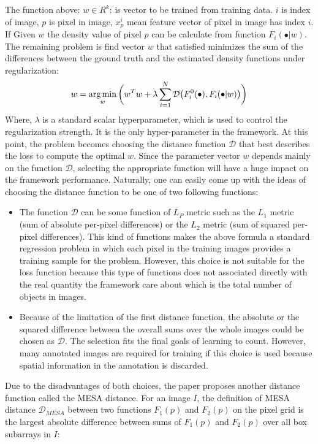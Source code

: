 The function above: 
$w \in R^k$: is vector to be trained from training data. $i$ is index of image, $p$ is pixel in image, $x^i_p$ mean feature vector of pixel in image has index $i$. If Given $w$ the density value of pixel $p$ can be calculate from function $F_i(\bullet|w)$. The remaining problem is find vector $w$ that satisfied minimizes the sum of the differences between the ground truth and the estimated density functions under regularization: 
\begin{displaymath}
    w = \operatorname*{arg\,min}_w\bigg(w^{T}w + \lambda \sum_{i=1}^{N} \mathcal{D}\big(F_{i}^{0}(\bullet),F_{i}(\bullet|w)\big) \bigg)
\end{displaymath}
Where, $\lambda$ is a standard scalar hyperparameter, which is used to control the regularization strength. It is the only hyper-parameter in the framework.
At this point, the problem becomes choosing the distance function $\mathcal{D}$ that best describes the loss to compute the optimal $w$.
Since the parameter vector $w$ depends mainly on the function $\mathcal{D}$, selecting the appropriate function will have a huge impact on the framework performance. Naturally, one can easily come up with the ideas of choosing the distance function to be one of two following functions:
\begin{itemize}
    \item The function $\mathcal{D}$ can be some function of $L_P$ metric such as the $L_1$ metric (sum of absolute per-pixel differences) or the $L_2$ metric (sum of squared per-pixel differences). This kind of functions makes the above formula a standard regression problem in which each pixel in the training images provides a training sample for the problem. However, this choice is not suitable for the loss function because this type of functions does not associated directly with the real quantity the framework care about which is the total number of objects in images.
     \item Because of the limitation of the first distance function, the absolute or the squared difference between the overall sums over the whole images could be chosen as $\mathcal{D}$. The selection fits the final goals of learning to count. However, many annotated images are required for training if this choice is used because spatial information in the annotation is discarded.
\end{itemize} 
Due to the disadvantages of both choices, the paper proposes another distance function called the MESA distance. For an image $I$, the definition of MESA distance $\mathcal{D}_{MESA}$ between two functions $F_{1}(p)$ and $F_{2}(p)$ on the pixel grid is the largest absolute difference between sums of $F_{1}(p)$ and $F_{2}(p)$ over all box subarrays in $I$:

